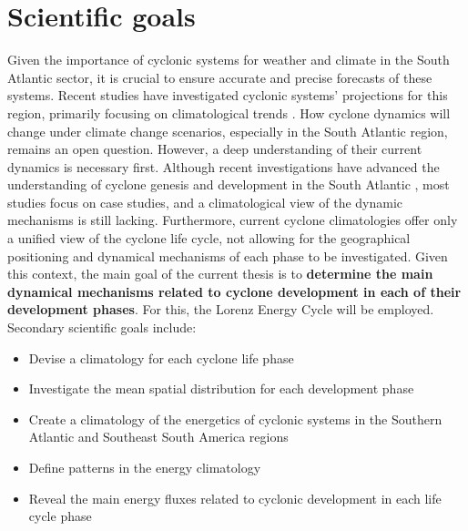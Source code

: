 \section{Scientific goals}

Given the importance of cyclonic systems for weather and climate in the South Atlantic sector, it is crucial to ensure accurate and precise forecasts of these systems. Recent studies have investigated cyclonic systems' projections for this region, primarily focusing on climatological trends \citep[e.g.]{reboita2018extratropical,de2022future}. How cyclone dynamics will change under climate change scenarios, especially in the South Atlantic region, remains an open question. However, a deep understanding of their current dynamics is necessary first. Although recent investigations have advanced the understanding of cyclone genesis and development in the South Atlantic \citep[e.g.]{dias2011energy,dias2013synoptic,gozzo2014subtropical,reboita2018key,gramcianinov2019properties}, most studies focus on case studies, and a climatological view of the dynamic mechanisms is still lacking. Furthermore, current cyclone climatologies offer only a unified view of the cyclone life cycle, not allowing for the geographical positioning and dynamical mechanisms of each phase to be investigated. Given this context, the main goal of the current thesis is to \textbf{determine the main dynamical mechanisms related to cyclone development in each of their development phases}. For this, the Lorenz Energy Cycle will be employed. Secondary scientific goals include:

\begin{itemize}
    \item Devise a climatology for each cyclone life phase
    \item Investigate the mean spatial distribution for each development phase
    \item Create a climatology of the energetics of cyclonic systems in the Southern Atlantic and Southeast South America regions
    \item Define patterns in the energy climatology
    \item Reveal the main energy fluxes related to cyclonic development in each life cycle phase
\end{itemize}


